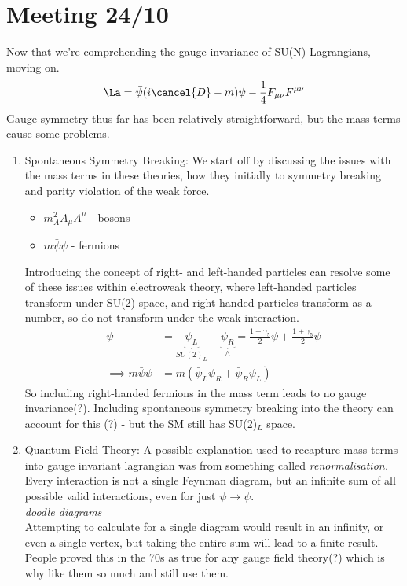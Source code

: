 \documentclass[a4paper, 11pt, normalem]{article}
\begin{document}
\section*{Meeting 24/10}
Now that we're comprehending the gauge invariance of SU(N) Lagrangians, moving on. 
\begin{align}
    \La = \bar{\psi}(i\cancel{D}-m)\psi - \frac14 F_{\mu\nu}F^{\mu\nu}
\end{align}
Gauge symmetry thus far has been relatively straightforward, but the mass terms cause some problems.
\begin{enumerate}
    \item Spontaneous Symmetry Breaking: We start off by discussing the issues with the mass terms in these theories, how they initially to symmetry breaking and parity violation of the weak force. 
        \begin{itemize}
            \item $m_A^2A_\mu A^\mu$ - bosons
            \item $m\bar{\psi}\psi$ - fermions
        \end{itemize}
        Introducing the concept of right- and left-handed particles can resolve some of these issues within electroweak theory, where left-handed particles transform under SU(2) space, and right-handed particles transform as a number, so do not transform under the weak interaction. 
        \begin{align}
            \psi &= \underbrace{\psi_L}_{SU(2)_L} + \underbrace{\psi_R}_{\land} = \frac{1-\gamma_5}{2}\psi + \frac{1+\gamma_5}{2}\psi \\
            \implies m\bar{\psi}\psi &= m\left(\bar{\psi}_L\psi_R + \bar{\psi}_R\psi_L\right)
        \end{align}
        So including right-handed fermions in the mass term leads to no gauge invariance(?). 
        Including spontaneous symmetry breaking into the theory can account for this (?) - but the SM still has SU(2)$_L$ space.
    \item Quantum Field Theory: A possible explanation used to recapture mass terms into gauge invariant lagrangian was from something called \emph{renormalisation.} 
        Every interaction is not a single Feynman diagram, but an infinite sum of all possible valid interactions, even for just $\psi\to\psi$. \\
        \textit{doodle diagrams}\\
        Attempting to calculate for a single diagram would result in an infinity, or even a single vertex, but taking the entire sum will lead to a finite result. 
        People proved this in the 70s as true for any gauge field theory(?) which is why like them so much and still use them. 
\end{enumerate}
\end{document}

